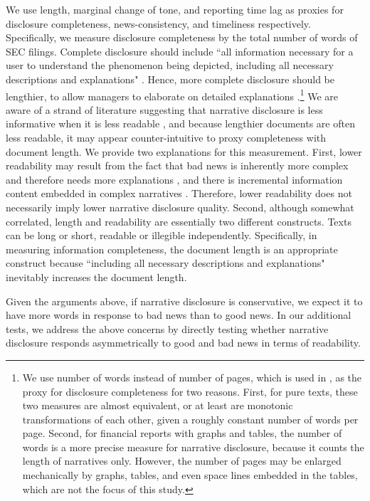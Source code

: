 \documentclass[letterpaper,12pt]{article}
\begin{document}
\begin{spacing}{1.5}
\noindent We use length, marginal change of tone, and reporting time lag as proxies for disclosure completeness, news-consistency, and timeliness respectively. Specifically, we measure disclosure completeness by the total number of words of SEC filings. Complete disclosure should include ``all information necessary for a user to understand the phenomenon being depicted, including all necessary descriptions and explanations" \cite[QC12]{fasbConceptualFrameworkFinancial2018}. Hence, more complete disclosure should be lengthier, to allow managers to elaborate on detailed explanations  \cite{leuzDisclosureCostCapital2009}.\footnote{We use number of words instead of number of pages, which is used in , as the proxy for disclosure completeness for two reasons. First, for pure texts, these two measures are almost equivalent, or at least are monotonic transformations of each other, given a roughly constant number of words per page. Second, for financial reports with graphs and tables, the number of words is a more precise measure for narrative disclosure, because it counts the length of narratives only. However, the number of pages may be enlarged mechanically by graphs, tables, and even space lines embedded in the tables, which are not the focus of this study.} We are aware of a strand of literature suggesting that narrative disclosure is less informative when it is less readable \cite{liAnnualReportReadability2008, loEarningsManagementAnnual2017, loughranMeasuringReadabilityFinancial2014}, and because lengthier documents are often less readable, it may appear counter-intuitive to proxy completeness with document length. We provide two explanations for this measurement. First, lower readability may result from the fact that bad news is inherently more complex and therefore needs more explanations \cite{bloomfieldDiscussionAnnualReport2008}, and there is incremental information content embedded in complex narratives \cite{busheeLinguisticComplexityFirm2018}. Therefore, lower readability does not necessarily imply lower narrative disclosure quality. Second, although somewhat correlated, length and readability are essentially two different constructs. Texts can be long or short, readable or illegible independently. Specifically, in measuring information completeness, the document length is an appropriate construct because ``including all necessary descriptions and explanations" \cite[QC12]{fasbConceptualFrameworkFinancial2018} inevitably increases the document length. 

Given the arguments above, if narrative disclosure is conservative, we expect it to have more words in response to bad news than to good news. In our additional tests, we address the above concerns by directly testing whether narrative disclosure responds asymmetrically to good and bad news in terms of readability.


\end{spacing}
\end{document}
